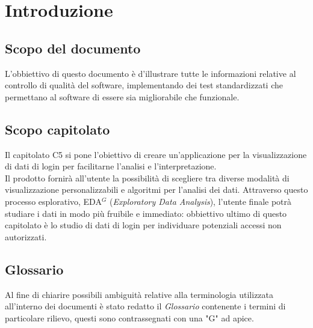 \section{Introduzione}

\subsection{Scopo del documento}

L'obbiettivo di questo documento è d'illustrare tutte le informazioni relative al controllo di qualità del software, implementando dei test standardizzati che permettano al software di essere sia migliorabile che funzionale.

\subsection{Scopo capitolato}
Il capitolato C5 si pone l'obiettivo di creare un'applicazione per la visualizzazione di dati
di login per facilitarne l'analisi e l'interpretazione.\\
Il prodotto fornirà all'utente la possibilità di scegliere tra diverse modalità di visualizzazione personalizzabili 
e algoritmi per l'analisi dei dati. Attraverso questo processo esplorativo, EDA$^{G}$ (\textit{Exploratory Data Analysis}), 
l'utente finale potrà studiare i dati in modo più fruibile e immediato: obbiettivo ultimo di questo capitolato 
è lo studio di dati di login per individuare potenziali accessi non autorizzati.

\subsection{Glossario}
Al fine di chiarire possibili ambiguità relative alla terminologia utilizzata all'interno dei
documenti è stato redatto il \textit{Glossario} contenente i termini di particolare rilievo, questi
sono contrassegnati con una "G" ad apice.
\newpage